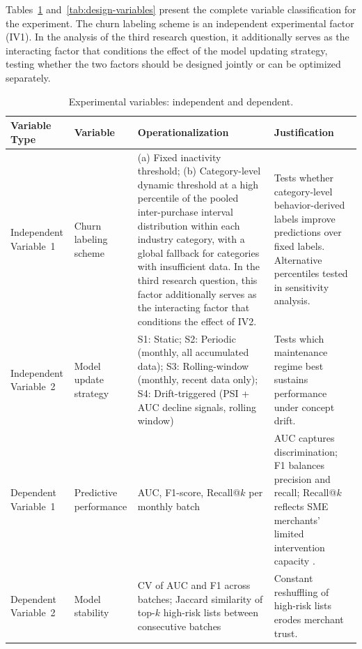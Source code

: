 Tables~\ref{tab:exp-variables} and~\ref{tab:design-variables} present the complete variable classification for the experiment. The churn labeling scheme is an independent experimental factor (IV1). In the analysis of the third research question, it additionally serves as the interacting factor that conditions the effect of the model updating strategy, testing whether the two factors should be designed jointly or can be optimized separately.

\begin{table}[htbp]
  \centering
  \begin{threeparttable}[c]
    \caption{Experimental variables: independent and dependent.}
    \label{tab:exp-variables}
    \footnotesize
    \begin{tabular}{>{\raggedright\arraybackslash}p{2.1cm} >{\raggedright\arraybackslash}p{1.9cm} >{\raggedright\arraybackslash}p{4.6cm} >{\raggedright\arraybackslash}p{4.6cm}}
      \toprule
      Variable Type & Variable & Operationalization & Justification \\
      \midrule
      Independent Variable~1 & Churn labeling scheme &
        (a) Fixed inactivity threshold; (b) Category-level dynamic threshold at a high percentile of the pooled inter-purchase interval distribution within each industry category, with a global fallback for categories with insufficient data. In the third research question, this factor additionally serves as the interacting factor that conditions the effect of IV2.\tnote{a} &
        Tests whether category-level behavior-derived labels improve predictions over fixed labels. Alternative percentiles tested in sensitivity analysis. \\[6pt]
      Independent Variable~2 & Model update strategy &
        S1: Static; S2: Periodic (monthly, all accumulated data); S3: Rolling-window (monthly, recent data only); S4: Drift-triggered (PSI + AUC decline signals, rolling window) &
        Tests which maintenance regime best sustains performance under concept drift. \\
      \midrule
      Dependent Variable~1 & Predictive performance &
        AUC, F1-score, Recall@$k$ per monthly batch &
        AUC captures discrimination; F1 balances precision and recall; Recall@$k$ reflects SME merchants' limited intervention capacity \cite{Shahabikargar2026}. \\[6pt]
      Dependent Variable~2 & Model stability &
        CV of AUC and F1 across batches; Jaccard similarity of top-$k$ high-risk lists between consecutive batches &
        Constant reshuffling of high-risk lists erodes merchant trust. \\[6pt]

\end{tabular}
\end{threeparttable}
\end{table}
